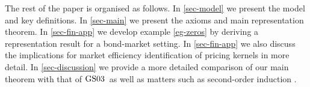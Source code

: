 \documentclass[ecta,nameyear,draft]{econsocart}
\makeatletter
\newcommand{\novel}{\mathfrak f}
\newcommand{\past}{{D^\star}}
\newcommand\ie{i\@.e\@ifnextchar.{}{.\@}}
\newcommand{\gsii}{$\textup{GS03}$}
\theoremstyle{plain}
\theoremstyle{remark}
\makeatother
\begin{document}

The rest of the paper is organised as follows. In \cref{sec-model} we present
the model and key definitions. In \cref{sec-main} we present the axioms and
main representation theorem. In \cref{sec-fin-app} we develop example
\cref{eg-zeros} by deriving a representation result for a bond-market setting.
In \cref{sec-fin-app} we also discuss the implications for market efficiency
identification of pricing kernels in more detail. In \cref{sec-discussion} we
provide a more detailed comparison of our main theorem with that of \gsii\ as
well as matters such as second-order induction \citep{argenziano2019second}.
\end{document}
